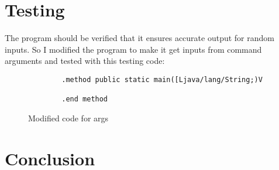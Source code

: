 \documentclass[a4paper, 12pt]{article}
\begin{document}
    \section{Testing}
    The program should be verified that it ensures accurate output for random inputs. So I modified the program to make it get inputs from command arguments and tested with this testing code:
    \begin{figure}[H]
        \begin{lstlisting}
        .method public static main([Ljava/lang/String;)V
            
        .end method
        \end{lstlisting}

        \centering        
        \caption{Modified code for args}
    \end{figure}

    \section{Conclusion}


    
    
\end{document}
